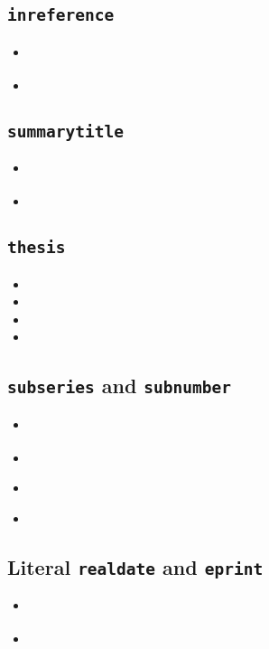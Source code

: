 \documentclass[a4paper,12pt,twoside]{scrartcl}
\newcommand*{\Typ}[1]{\texttt{\symbol{64}#1}}
\newcommand*{\Feld}[1]{\texttt{#1}}
\begin{document}
\subsection{\Typ{inreference}}
\begin{itemize}
    \item\cite{bauchhenss:et:al:1978}%
    \item{}%
\end{itemize}

\subsection{\Feld{summarytitle}}
\begin{itemize}
    \item\cite{ilinskaja:1965}%
    \item{}%
\end{itemize}

\subsection{\Typ{thesis}}
\begin{itemize}
    \item{}%
    \item{}%
    \item{}%
    \item{}%
\end{itemize}

\subsection{\Feld{subseries} and \Feld{subnumber}}
\begin{itemize}
    \item\cite{kossack:et:al:1980}%
    \item{}%
    \item\cite{harck:1980}%
    \item{}%
\end{itemize}

\subsection{Literal \Feld{realdate} and \Feld{eprint}}
\begin{itemize}
    \item\cite{lindauer:oj}%
    \item{}%
\end{itemize}
\end{document}
